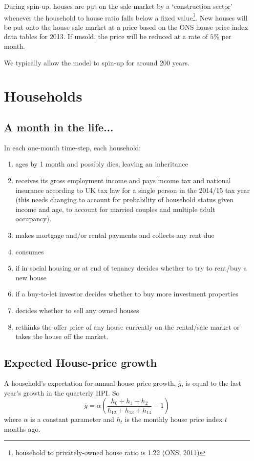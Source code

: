 \documentclass{report}
\begin{document}
During spin-up, houses are put on the sale market by a `construction sector' whenever the household to house ratio falls below a fixed value\footnote{household to privately-owned house ratio is 1.22 (ONS, 2011)}. New houses will be put onto the house sale market at a price based on the ONS house price index data tables for 2013. If unsold, the price will be reduced at a rate of $5\%$ per month.

We typically allow the model to spin-up for around 200 years.

\section{Households}

\subsection{A month in the life...}
In each one-month time-step, each household:
\begin{enumerate}
\item ages by 1 month and possibly dies, leaving an inheritance
\item receives its gross employment income and pays income tax and national insurance according to UK tax law for a single person in the 2014/15 tax year (this needs changing to account for probability of household status given income and age, to account for married couples and multiple adult occupancy).
\item makes mortgage and/or rental payments and collects any rent due
\item consumes
\item if in social housing or at end of tenancy decides whether to try to rent/buy a new house
\item if a buy-to-let investor decides whether to buy more investment properties
\item decides whether to sell any owned houses
\item rethinks the offer price of any house currently on the rental/sale market or takes the house off the market.
\end{enumerate}


\subsection{Expected House-price growth}
\label{housepricegrowth}
A household's expectation for annual house price growth, $\bar{g}$, is equal to the last year's growth in the quarterly HPI. So
\begin{equation}
\bar{g} = \alpha\left(\frac{h_0 + h_{1} + h_{2}}{h_{12} + h_{13} + h_{14}} - 1\right)
\end{equation}
where $\alpha$ is a constant parameter and $h_t$ is the monthly house price index $t$ months ago.
\end{document}
